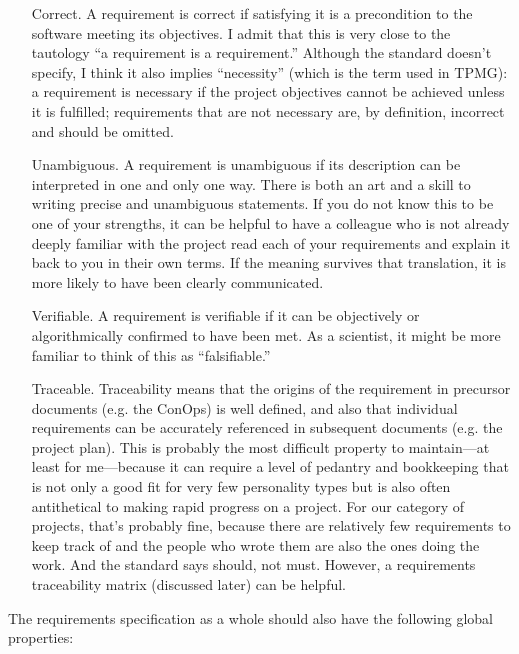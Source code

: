 \documentclass[12pt,oneside]{book}
\begin{document}
\begin{itemize}[wide, labelwidth=!, labelindent=0pt, font=\bfseries]

\item[Correct.] A requirement is correct if satisfying it is a precondition to the software meeting its objectives. I admit that this is very close to the tautology ``a requirement is a requirement.'' Although the standard doesn't specify, I think it also implies ``necessity'' (which is the term used in TPMG): a requirement is necessary if the project objectives cannot be achieved unless it is fulfilled; requirements that are not necessary are, by definition, incorrect and should be omitted.
	
\item[Unambiguous.] A requirement is unambiguous if its description can be interpreted in one and only one way. There is both an art and a skill to writing precise and unambiguous statements. If you do not know this to be one of your strengths, it can be helpful to have a colleague who is not already deeply familiar with the project read each of your requirements and explain it back to you in their own terms. If the meaning survives that translation, it is more likely to have been clearly communicated.
	
\item[Verifiable.] A requirement is verifiable if it can be objectively or algorithmically confirmed to have been met. As a scientist, it might be more familiar to think of this as ``falsifiable.''
	
\item[Traceable.] Traceability means that the origins of the requirement in precursor documents (e.g. the ConOps) is well defined, and also that individual requirements can be accurately referenced in subsequent documents (e.g. the project plan). This is probably the most difficult property to maintain---at least for me---because it can require a level of pedantry and bookkeeping that is not only a good fit for very few personality types but is also often antithetical to making rapid progress on a project. For our category of projects, that's probably fine, because there are relatively few requirements to keep track of and the people who wrote them are also the ones doing the work. And the standard says should, not must. However, a requirements traceability matrix (discussed later) can be helpful.
\end{itemize}

\noindent
The requirements specification as a whole should also have the following global properties:
\end{document}
